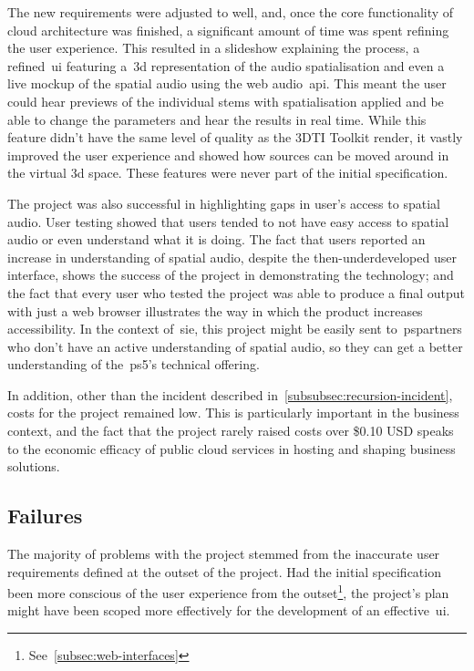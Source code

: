 The new requirements were adjusted to well, and, once the core functionality of cloud architecture was finished,
a significant amount of time was spent refining the user experience.
This resulted in a slideshow explaining the process,
a refined~\gls{ui} featuring a~\gls{3d} representation of the audio spatialisation and even a live mockup of the spatial audio
using the web audio~\gls{api}.
This meant the user could hear previews of the individual stems with spatialisation applied
and be able to change the parameters and hear the results in real time.
While this feature didn't have the same level of quality as the 3DTI Toolkit render,
it vastly improved the user experience and showed how sources can be moved around in the virtual 3d space.
These features were never part of the initial specification.

The project was also successful in highlighting gaps in user's access to spatial audio.
User testing showed that users tended to not have easy access to spatial audio or even understand what it is doing.
The fact that users reported an increase in understanding of spatial audio,
despite the then-underdeveloped user interface, shows the success of the project in demonstrating the technology;
and the fact
that every user who tested the project was able
to produce a final output with just a web browser illustrates the way in which the product increases accessibility.
In the context of~\gls{sie},
this project might be easily sent
to~\glspl{pspartner} who don't have an active understanding of spatial audio,
so they can get a better understanding of the~\gls{ps5}'s technical offering.

In addition, other than the incident described in~\ref{subsubsec:recursion-incident},
costs for the project remained low.
This is particularly important in the business context,
and the fact that the project rarely raised costs over \$0.10 USD speaks to the economic efficacy of public cloud services
in hosting and shaping business solutions.

\subsection{Failures}\label{subsec:failures}

The majority of problems with the project stemmed from the inaccurate user requirements
defined at the outset of the project.
Had the initial specification been more conscious of the user experience from the outset\footnote{See~\ref{subsec:web-interfaces}},
the project's plan might have been scoped more effectively for the development of an effective~\gls{ui}.

